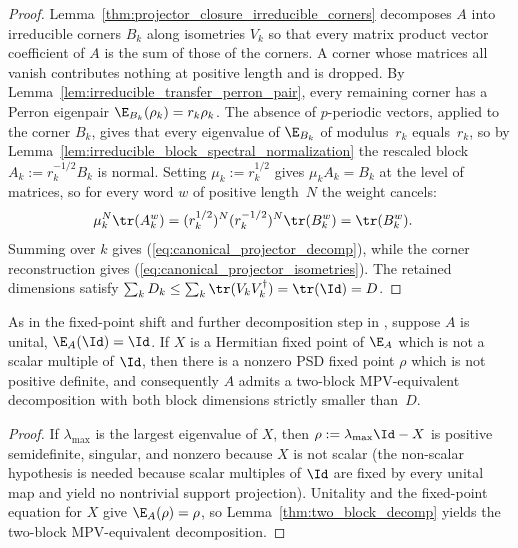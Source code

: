 \begin{proof}
    \leanok
    Lemma~\ref{thm:projector_closure_irreducible_corners} decomposes $A$
    into irreducible corners $B_k$ along isometries $V_k$ so that every matrix
    product vector coefficient of $A$ is the sum of those of the corners. A
    corner whose matrices all vanish contributes nothing at positive length
    and is dropped. By Lemma~\ref{lem:irreducible_transfer_perron_pair}, every
    remaining corner has a Perron eigenpair $\E_{B_k}(\rho_k)=r_k\rho_k$. The
    absence of $p$-periodic vectors, applied to the corner $B_k$, gives that
    every eigenvalue of $\E_{B_k}$ of modulus~$r_k$ equals~$r_k$, so by
    Lemma~\ref{lem:irreducible_block_spectral_normalization} the rescaled
    block $A_k:=r_k^{-1/2}B_k$ is normal. Setting $\mu_k:=r_k^{1/2}$ gives
    $\mu_kA_k=B_k$ at the level of matrices, so for every word $w$ of positive
    length~$N$ the weight cancels:
    \begin{align}
        \mu_k^N\tr(A_k^w)
         & =
        (r_k^{1/2})^N(r_k^{-1/2})^N\tr(B_k^w)
        =
        \tr(B_k^w).
        \notag
    \end{align}
    Summing over $k$ gives (\ref{eq:canonical_projector_decomp}), while the
    corner reconstruction gives (\ref{eq:canonical_projector_isometries}).
    The retained dimensions satisfy
    $\sum_kD_k\le\sum_k\tr(V_kV_k^\dagger)=\tr(\Id)=D$.
\end{proof}

\begin{lemma}%
    \label{thm:unital_nonscalar_fixed_point_split}
    \leanok
    As in the fixed-point shift and further decomposition step in
    \cite[Theorem~4]{PerezGarcia2007Matrix}, suppose $A$ is unital,
    $\E_A(\Id)=\Id$. If $X$ is a Hermitian fixed point of $\E_A$ which is not
    a scalar multiple of $\Id$, then there is a nonzero PSD fixed point $\rho$
    which is not positive definite, and consequently $A$ admits a two-block
    MPV-equivalent decomposition with both block dimensions strictly smaller
    than~$D$.
\end{lemma}

\begin{proof}\leanok
    If $\lambda_{\max}$ is the largest eigenvalue of $X$, then
    $\rho:=\lambda_{\max}\Id-X$ is positive semidefinite, singular, and
    nonzero because $X$ is not scalar (the non-scalar hypothesis is needed
    because scalar multiples of $\Id$ are fixed by every unital map and yield
    no nontrivial support projection). Unitality and the fixed-point equation
    for $X$ give $\E_A(\rho)=\rho$, so Lemma~\ref{thm:two_block_decomp}
    yields the two-block MPV-equivalent decomposition.
\end{proof}
